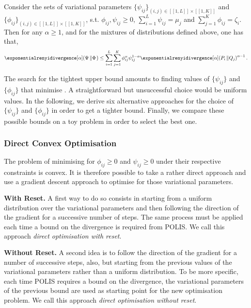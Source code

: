 \begin{lemma}
\label{pp:papini_lemma}
    Consider the sets of variational parameters $\{\psi_{ij}\}_{(i,j)\in[\![1,L]\!]\times [\![1,K]\!]}$ and $\{\phi_{ij}\}_{(i,j)\in[\![1,L]\!]\times [\![1,K]\!]}$, 
    s.t. 
    $\phi_{ij},\psi_{ij}\ge 0$,  $\textstyle\sum_{i=1}^L \psi_{ij} = \mu_j$ and $\textstyle\sum_{j=1}^K \phi_{ij} = \zeta_i$. 
    Then for any $\alpha\ge 1$, and for the mixtures of distributions defined above, one has that,
    \begin{align}
    \label{eq:papini_lemma}
        \exponentialrenyidivergence[\alpha](\Psi\left\Vert\Phi\right.) \leq \sum_{i=1}^L\sum_{j=1}^K \phi_{ij}^{\alpha} \psi_{ij}^{1-\alpha} \exponentialrenyidivergence[\alpha](P_i\left\Vert Q_j\right)^{\alpha-1}.
    \end{align}
\end{lemma}

The search for the tightest upper bound amounts to finding values of $\{\psi_{ij}\}$ and $\{\phi_{ij}\}$ that minimise .
A straightforward but unsuccessful choice would be uniform values. 
In the following, we derive six alternative approaches for the choice of $\{\psi_{ij}\}$ and $\{\phi_{ij}\}$ in order to get a tighter bound. 
Finally, we compare these possible bounds on a toy problem in order to select the best one. 



\subsubsection{Direct Convex Optimisation}
The problem of minimising  for $\phi_{ij}\geq 0$ and $\psi_{ij}\geq 0$ under their respective constraints is convex. 
It is therefore possible to take a rather direct approach and use a gradient descent approach to optimise for those variational parameters. 

\textbf{With Reset.}
A first way to do so consists in starting from a uniform distribution over the variational parameters and then following the direction of the gradient for a successive number of steps.
The same process must be applied each time a bound on the \Renyi divergence is required from POLIS. 
We call this approach \emph{direct optimisation with reset}.

\textbf{Without Reset.}
A second idea is to follow the direction of the gradient for a number of successive steps, also, but starting from the previous values of the variational parameters rather than a uniform distribution. 
To be more specific, each time POLIS requires a bound on the \Renyi divergence, the variational parameters of the previous bound are used as starting point for the new optimisation problem. 
We call this approach \emph{direct optimisation without reset}.


